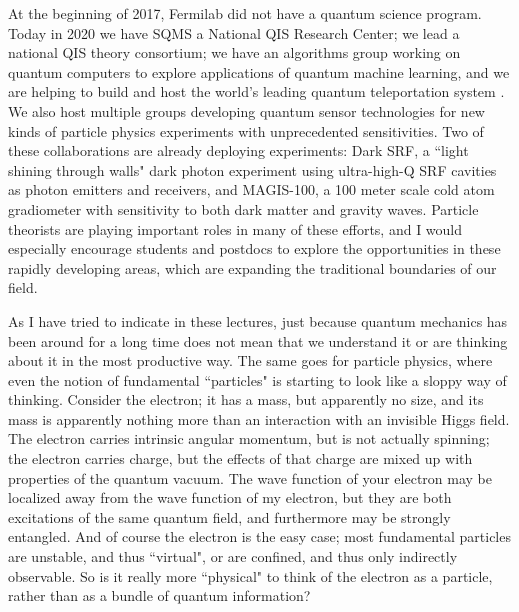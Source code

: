 \documentclass[a4paper,11pt]{article}
\begin{document}
At the beginning of 2017, Fermilab did not have a quantum science program. Today in 2020 we have SQMS \cite{SQMS} a National QIS Research Center;
we lead a national QIS theory consortium; we have an algorithms group working on quantum computers to explore applications of quantum machine learning,
and we are helping to build and host the world's leading quantum teleportation system \cite{Spiropulu:2020}. We also host  multiple groups developing 
quantum sensor technologies for new kinds of particle physics experiments with unprecedented sensitivities. Two of these collaborations are already
deploying experiments: Dark SRF, a ``light shining through walls" dark photon experiment using ultra-high-Q SRF cavities as photon emitters and receivers,
and MAGIS-100, a 100 meter scale cold atom gradiometer with sensitivity to both dark matter and gravity waves. Particle theorists are playing
important roles in many of these efforts, and I would especially encourage students and postdocs to explore the opportunities in these rapidly
developing areas, which are expanding the traditional boundaries of our field.

As I have tried to indicate in these lectures, just because quantum mechanics has been around for a long time does not mean that we understand it
or are thinking about it in the most productive way. The same goes for particle physics, where even the notion of fundamental ``particles" is starting
to look like a sloppy way of thinking. Consider the electron; it has a mass, but apparently no size, and its mass is apparently nothing more than
an interaction with an invisible Higgs field. The electron carries intrinsic angular momentum, but is not actually spinning; the electron carries charge,
but the effects of that charge are mixed up with properties of the quantum vacuum. The wave function of your electron may be localized away from
the wave function of my electron, but they are both excitations of the same quantum field, and furthermore may be strongly entangled. And of course
the electron is the easy case; most fundamental particles are unstable, and thus ``virtual", or are confined, and thus only indirectly observable. So is it
really more ``physical" to think of the electron as a particle, rather than as a bundle of quantum information? 
 
\end{document}
